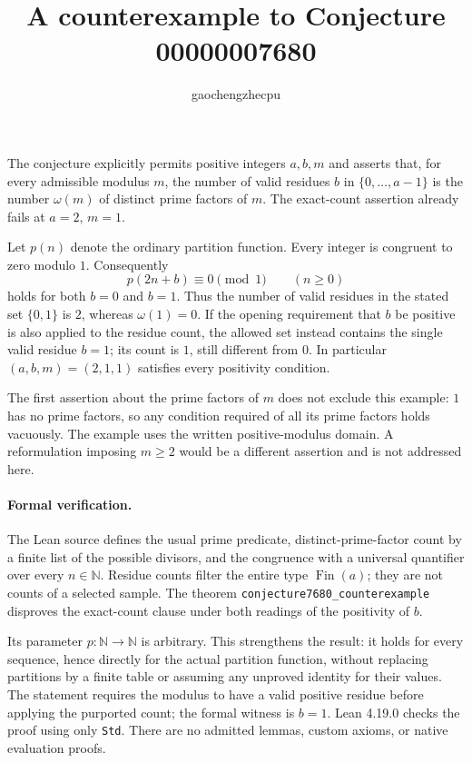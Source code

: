 \documentclass[11pt]{article}
\title{A counterexample to Conjecture 00000007680}
\author{gaochengzhecpu}
\date{}
\begin{document}
\maketitle

The conjecture explicitly permits positive integers $a,b,m$ and asserts that,
for every admissible modulus $m$, the number of valid residues $b$ in
$\{0,\ldots,a-1\}$ is the number $\omega(m)$ of distinct prime factors of $m$.
The exact-count assertion already fails at $a=2$, $m=1$.

Let $p(n)$ denote the ordinary partition function. Every integer is congruent
to zero modulo $1$. Consequently
\[
 p(2n+b)\equiv0\pmod1\qquad(n\ge0)
\]
holds for both $b=0$ and $b=1$. Thus the number of valid residues in the stated
set $\{0,1\}$ is $2$, whereas $\omega(1)=0$. If the opening requirement that
$b$ be positive is also applied to the residue count, the allowed set instead
contains the single valid residue $b=1$; its count is $1$, still different
from $0$. In particular $(a,b,m)=(2,1,1)$ satisfies every positivity condition.

The first assertion about the prime factors of $m$ does not exclude this
example: $1$ has no prime factors, so any condition required of all its prime
factors holds vacuously. The example uses the written positive-modulus
domain. A reformulation imposing $m\ge2$ would be a different assertion and
is not addressed here.

\paragraph{Formal verification.}
The Lean source defines the usual prime predicate, distinct-prime-factor
count by a finite list of the possible divisors, and the congruence with a
universal quantifier over every $n\in\mathbb N$. Residue counts filter the
entire type $\operatorname{Fin}(a)$; they are not counts of a selected sample.
The theorem \texttt{conjecture7680\_counterexample} disproves the exact-count
clause under both readings of the positivity of $b$.

Its parameter $p:\mathbb N\to\mathbb N$ is arbitrary. This strengthens the
result: it holds for every sequence, hence directly for the actual partition
function, without replacing partitions by a finite table or assuming any
unproved identity for their values. The statement requires the modulus to
have a valid positive residue before applying the purported count; the
formal witness is $b=1$. Lean 4.19.0 checks the proof using only \texttt{Std}.
There are no admitted lemmas, custom axioms, or native evaluation proofs.
\end{document}
